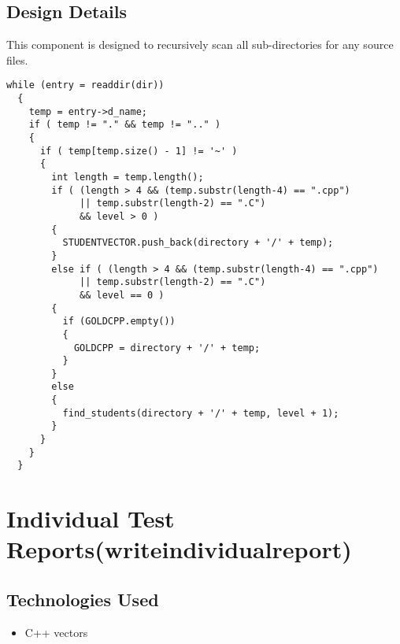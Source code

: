 \subsection{Design Details}
This component is designed to recursively scan all sub-directories for any source files.
\begin{lstlisting}
while (entry = readdir(dir)) 
  {
    temp = entry->d_name;
    if ( temp != "." && temp != ".." )
    {
      if ( temp[temp.size() - 1] != '~' )
      {
        int length = temp.length();
        if ( (length > 4 && (temp.substr(length-4) == ".cpp")
             || temp.substr(length-2) == ".C")
             && level > 0 )
        {
          STUDENTVECTOR.push_back(directory + '/' + temp);
        }
        else if ( (length > 4 && (temp.substr(length-4) == ".cpp")
             || temp.substr(length-2) == ".C")
             && level == 0 )
        {
          if (GOLDCPP.empty())
          {
            GOLDCPP = directory + '/' + temp;
          }
        }
        else
        {
          find_students(directory + '/' + temp, level + 1);
        }
      }
    }
  }
\end{lstlisting}




\section{Individual Test Reports(writeindividualreport)}

\subsection{Technologies  Used}
\begin{itemize}
\item C++ vectors
\end{itemize}

